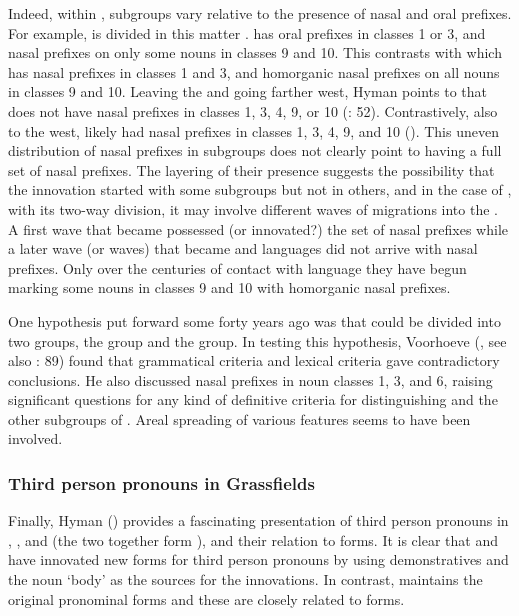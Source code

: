 \documentclass[output=paper]{langsci/langscibook}
\begin{document}
  Indeed, within , subgroups vary relative to the presence of nasal and oral prefixes. For example,  is divided in this matter \citep[55]{Stallcup1980geo}.  has oral prefixes in classes 1 or 3, and nasal prefixes on only some nouns in classes 9 and 10. This contrasts with  which has nasal prefixes in classes 1 and 3, and homorganic nasal prefixes on all nouns in classes 9 and 10. Leaving the  and going farther west, Hyman points to  that does not have nasal prefixes in classes 1, 3, 4, 9, or 10 (\citealt{VoorhoeveDeWolf1969}: 52). Contrastively, also to the west,  likely had nasal prefixes in classes 1, 3, 4, 9, and 10 (\citealt{Watters1981,Watters1980ejagham,Watters2016}). This uneven distribution of nasal prefixes in  subgroups does not clearly point to  having a full set of nasal prefixes. The layering of their presence suggests the possibility that the innovation started with some subgroups but not in others, and in the case of , with its two-way division, it may involve different waves of migrations into the . A first wave that became  possessed (or innovated?) the set of nasal prefixes while a later wave (or waves) that became  and  languages did not arrive with nasal prefixes. Only over the centuries of contact with  language they have begun marking some nouns in classes 9 and 10 with homorganic nasal prefixes.


One hypothesis put forward some forty years ago was that  could be divided into two groups, the  group and the  group. In testing this hypothesis, Voorhoeve (\citeyear*{Voorhoeve1980bane}, see also \citealt{Watters1982}: 89) found that grammatical criteria and lexical criteria gave contradictory conclusions. He also discussed nasal prefixes in noun classes 1, 3, and 6, raising significant questions for any kind of definitive criteria for distinguishing  and the other subgroups of . Areal spreading of various features seems to have been involved.


\subsubsection{Third person pronouns in Grassfields}

Finally, Hyman () provides a fascinating presentation of third person pronouns in , , and  (the two together form ), and their relation to  forms. It is clear that  and  have innovated new forms for third person pronouns by using demonstratives and the noun ‘body’ as the sources for the innovations. In contrast,  maintains the original pronominal forms and these are closely related to  forms. 
\end{document}
